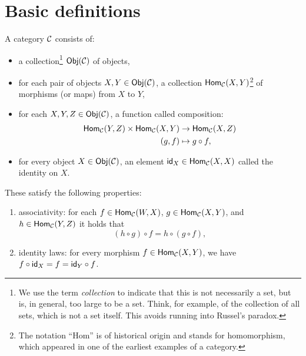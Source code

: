 \section{Basic definitions}

	
	\begin{defn}[Category]
		\label{def:cat}
		 A category ${\mathcal{C}}$ consists of:
		 	\begin{itemize}
		 		\item a collection\footnote{We use the term \emph{collection} to indicate that this is not necessarily a set, but is, in general, too large to be a set. Think, for example, of the collection of all sets, which is not a set itself. This avoids running into Russel's paradox.} $\mathsf{Obj}({\mathcal{C}})$ of objects,
		 		\item for each pair of objects $X,Y\in\mathsf{Obj}({\mathcal{C}})$, a collection $\mathsf{Hom}_{\mathcal{C}}(X,Y)$\footnote{The notation ``Hom'' is of historical origin and stands for homomorphism, which appeared in one of the earliest examples of a category.} of morphisms (or maps) from $X$ to $Y$,
		 		\item for each $X,Y,Z\in\mathsf{Obj}({\mathcal{C}})$, a function called composition:
		 				\begin{align}
			 				\mathsf{Hom}_{\mathcal{C}}(Y,Z)\times\mathsf{Hom}_{\mathcal{C}}(X,Y)&\to\mathsf{Hom}_{\mathcal{C}}(X,Z)\\
			 				(g,f)&\mapsto g\circ f,
		 				\end{align}
		 		\item for every object $X\in\mathsf{Obj}({\mathcal{C}})$, an element $\mathsf{id}_X\in\mathsf{Hom}_{\mathcal{C}}(X,X)$ called the identity on $X$.
		 	\end{itemize}
	 	These satisfy the following properties:
	 		\begin{enumerate}
	 			\item associativity: for each $f\in\mathsf{Hom}_{\mathcal{C}}(W,X)$, $g\in\mathsf{Hom}_{\mathcal{C}}(X,Y)$, and $h\in\mathsf{Hom}_{\mathcal{C}}(Y,Z)$ it holds that
	 					\begin{equation}
		 					(h\circ g)\circ f=h\circ(g\circ f),
	 					\end{equation} 
	 			\item identity laws: for every morphism $f\in\mathsf{Hom}_{\mathcal{C}}(X,Y)$, we have $f\circ\mathsf{id}_X=f=\mathsf{id}_Y\circ f$.
	 		\end{enumerate}
	\end{defn}

